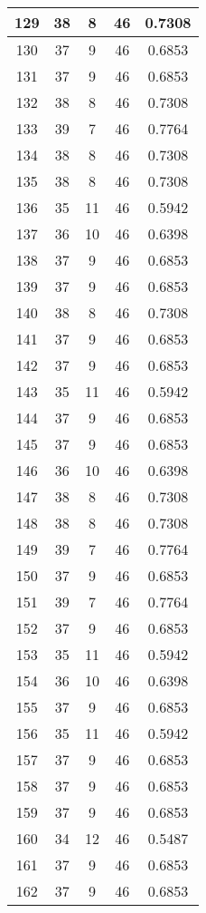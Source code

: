 \documentclass[letterpaper, 12pt]{article}
\begin{document}
\begin{longtable}{|c|c|c|c|c|}
\hline
129 & 38 & 8 & 46 & 0.7308 \\
\hline
130 & 37 & 9 & 46 & 0.6853 \\
\hline
131 & 37 & 9 & 46 & 0.6853 \\
\hline
132 & 38 & 8 & 46 & 0.7308 \\
\hline
133 & 39 & 7 & 46 & 0.7764 \\
\hline
134 & 38 & 8 & 46 & 0.7308 \\
\hline
135 & 38 & 8 & 46 & 0.7308 \\
\hline
136 & 35 & 11 & 46 & 0.5942 \\
\hline
137 & 36 & 10 & 46 & 0.6398 \\
\hline
138 & 37 & 9 & 46 & 0.6853 \\
\hline
139 & 37 & 9 & 46 & 0.6853 \\
\hline
140 & 38 & 8 & 46 & 0.7308 \\
\hline
141 & 37 & 9 & 46 & 0.6853 \\
\hline
142 & 37 & 9 & 46 & 0.6853 \\
\hline
143 & 35 & 11 & 46 & 0.5942 \\
\hline
144 & 37 & 9 & 46 & 0.6853 \\
\hline
145 & 37 & 9 & 46 & 0.6853 \\
\hline
146 & 36 & 10 & 46 & 0.6398 \\
\hline
147 & 38 & 8 & 46 & 0.7308 \\
\hline
148 & 38 & 8 & 46 & 0.7308 \\
\hline
149 & 39 & 7 & 46 & 0.7764 \\
\hline
150 & 37 & 9 & 46 & 0.6853 \\
\hline
151 & 39 & 7 & 46 & 0.7764 \\
\hline
152 & 37 & 9 & 46 & 0.6853 \\
\hline
153 & 35 & 11 & 46 & 0.5942 \\
\hline
154 & 36 & 10 & 46 & 0.6398 \\
\hline
155 & 37 & 9 & 46 & 0.6853 \\
\hline
156 & 35 & 11 & 46 & 0.5942 \\
\hline
157 & 37 & 9 & 46 & 0.6853 \\
\hline
158 & 37 & 9 & 46 & 0.6853 \\
\hline
159 & 37 & 9 & 46 & 0.6853 \\
\hline
160 & 34 & 12 & 46 & 0.5487 \\
\hline
161 & 37 & 9 & 46 & 0.6853 \\
\hline
162 & 37 & 9 & 46 & 0.6853 \\

\end{longtable}
\end{document}
